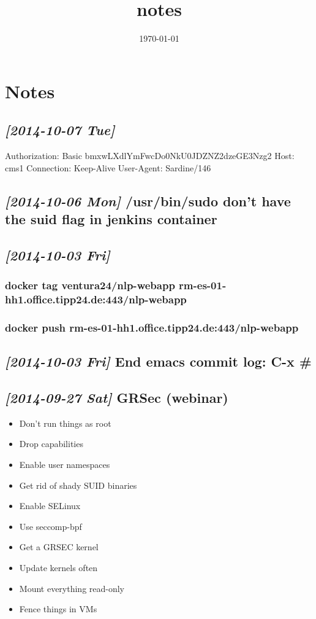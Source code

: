 \documentclass[11pt]{article}
\date{\today}
\title{notes}
\begin{document}
\maketitle
\tableofcontents

\section{Notes}
\label{sec-1}
\subsection{\textit{[2014-10-07 Tue]}}
\label{sec-1-1}
Authorization: Basic bmxwLXdlYmFwcDo0NkU0JDZNZ2dzeGE3Nzg2
Host: cms1
Connection: Keep-Alive
User-Agent: Sardine/146
\subsection{\textit{[2014-10-06 Mon]} /usr/bin/sudo don't have the suid flag in jenkins container}
\label{sec-1-2}
\subsection{\textit{[2014-10-03 Fri]}}
\label{sec-1-3}
\subsubsection{docker tag ventura24/nlp-webapp rm-es-01-hh1.office.tipp24.de:443/nlp-webapp}
\label{sec-1-3-1}
\subsubsection{docker push rm-es-01-hh1.office.tipp24.de:443/nlp-webapp}
\label{sec-1-3-2}
\subsection{\textit{[2014-10-03 Fri]} End emacs commit log: C-x \#}
\label{sec-1-4}
\subsection{\textit{[2014-09-27 Sat]} GRSec (webinar)}
\label{sec-1-5}
\begin{itemize}
\item Don't run things as root
\item Drop capabilities
\item Enable user namespaces
\item Get rid of shady SUID binaries
\item Enable SELinux
\item Use seccomp-bpf
\item Get a GRSEC kernel
\item Update kernels often
\item Mount everything read-only
\item Fence things in VMs
\end{itemize}
\end{document}
